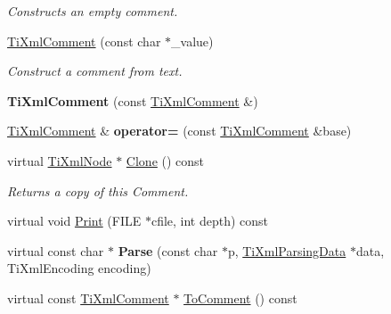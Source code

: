 \begin{DoxyCompactItemize}
\begin{DoxyCompactList}\small\item\em Constructs an empty comment. \end{DoxyCompactList}\item 
\hypertarget{class_ti_xml_comment_a37e7802ef17bc03ebe5ae79bf0713d47}{\hyperlink{class_ti_xml_comment_a37e7802ef17bc03ebe5ae79bf0713d47}{Ti\+Xml\+Comment} (const char $\ast$\+\_\+value)}\label{class_ti_xml_comment_a37e7802ef17bc03ebe5ae79bf0713d47}

\begin{DoxyCompactList}\small\item\em Construct a comment from text. \end{DoxyCompactList}\item 
\hypertarget{class_ti_xml_comment_afaec41ac2760ce946ba1590eb5708e50}{{\bfseries Ti\+Xml\+Comment} (const \hyperlink{class_ti_xml_comment}{Ti\+Xml\+Comment} \&)}\label{class_ti_xml_comment_afaec41ac2760ce946ba1590eb5708e50}

\item 
\hypertarget{class_ti_xml_comment_a50888f168745972a1d773a4f5a87beb8}{\hyperlink{class_ti_xml_comment}{Ti\+Xml\+Comment} \& {\bfseries operator=} (const \hyperlink{class_ti_xml_comment}{Ti\+Xml\+Comment} \&base)}\label{class_ti_xml_comment_a50888f168745972a1d773a4f5a87beb8}

\item 
\hypertarget{class_ti_xml_comment_a0d6662bdc52488b9e12b3c7a0453d028}{virtual \hyperlink{class_ti_xml_node}{Ti\+Xml\+Node} $\ast$ \hyperlink{class_ti_xml_comment_a0d6662bdc52488b9e12b3c7a0453d028}{Clone} () const }\label{class_ti_xml_comment_a0d6662bdc52488b9e12b3c7a0453d028}

\begin{DoxyCompactList}\small\item\em Returns a copy of this Comment. \end{DoxyCompactList}\item 
virtual void \hyperlink{class_ti_xml_comment_a6b316527aaa8da0370cd68c22a5a0f5f}{Print} (F\+I\+L\+E $\ast$cfile, int depth) const 
\item 
\hypertarget{class_ti_xml_comment_a11f1ee9d37a49c06f297c827d0f4e790}{virtual const char $\ast$ {\bfseries Parse} (const char $\ast$p, \hyperlink{class_ti_xml_parsing_data}{Ti\+Xml\+Parsing\+Data} $\ast$data, Ti\+Xml\+Encoding encoding)}\label{class_ti_xml_comment_a11f1ee9d37a49c06f297c827d0f4e790}

\item 
\hypertarget{class_ti_xml_comment_a00fb4215c20a2399ea05ac9b9e7e68a0}{virtual const \hyperlink{class_ti_xml_comment}{Ti\+Xml\+Comment} $\ast$ \hyperlink{class_ti_xml_comment_a00fb4215c20a2399ea05ac9b9e7e68a0}{To\+Comment} () const }\label{class_ti_xml_comment_a00fb4215c20a2399ea05ac9b9e7e68a0}


\end{DoxyCompactItemize}
